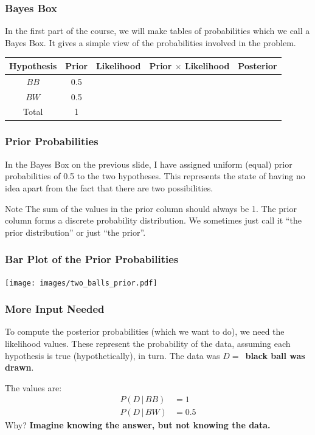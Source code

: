 \documentclass{beamer}
\newcommand{\given}{\,|\,}
\begin{document}
\begin{frame}
\frametitle{Bayes Box}
In the first part of the course, we will make tables of probabilities
which we call a Bayes Box. It gives a simple view of the probabilities
involved in the problem.\\[0.5em]\pause

\begin{tabular}{|c|c|c|c|c|}
\hline
Hypothesis & Prior & Likelihood & Prior $\times$ Likelihood & Posterior \\
\hline
$BB$ & 0.5 & & & \\
$BW$ & 0.5 & & & \\
\hline
Total & 1 & & & \\
\hline
\end{tabular}

\end{frame}


\begin{frame}
\frametitle{Prior Probabilities}
In the Bayes Box on the previous slide, I have assigned uniform (equal)
prior probabilities of 0.5 to the two hypotheses. This represents the state
of having no idea apart from the fact that there are two possibilities.\pause

\begin{alertblock}{Note}
The sum of the values in the prior column should always be 1.
The prior column forms a discrete probability distribution.
We sometimes just call it ``the prior distribution'' or just ``the prior''.
\end{alertblock}


\end{frame}



\begin{frame}
\frametitle{Bar Plot of the Prior Probabilities}

\centering
\texttt{[image: images/two\_balls\_prior.pdf]}

\end{frame}



\begin{frame}
\frametitle{More Input Needed}
To compute the posterior probabilities (which we want to do), we need
the likelihood values. These represent the probability of the data, assuming
each hypothesis is true (hypothetically), in turn. The data was
$D = $~{\bf black ball was drawn}.\pause

The values are:
\begin{align}
P(D \given BB) &= 1 \\
P(D \given BW) &= 0.5
\end{align}
Why? {\bf Imagine knowing the answer, but not knowing the data.}

\end{frame}
\end{document}
